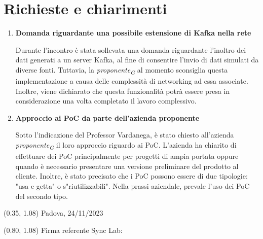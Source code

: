 \documentclass{article}
\begin{document}
\section{Richieste e chiarimenti}
\begin{enumerate}
    \item \textbf{Domanda riguardante una possibile estensione di Kafka nella rete}
    
    Durante l'incontro è stata sollevata una domanda riguardante l'inoltro dei dati generati a un server Kafka, al fine di consentire l'invio di dati simulati da diverse fonti. Tuttavia, la \textit{proponente}\textsubscript{\textit{G}} al momento sconsiglia questa implementazione a causa delle complessità di networking ad essa associate.  
    Inoltre, viene dichiarato che questa funzionalità potrà essere presa in considerazione una volta completato il lavoro complessivo. 

    \item \textbf{Approccio ai PoC da parte dell'azienda proponente}
    
    Sotto l'indicazione del Professor Vardanega, è stato chiesto all’azienda \textit{proponente}\textsubscript{\textit{G}} il loro approccio riguardo ai PoC. L'azienda ha chiarito di effettuare dei PoC principalmente per progetti di ampia portata oppure quando è necessario presentare una versione preliminare del prodotto al cliente. Inoltre, è stato precisato che i PoC possono essere di due tipologie: "usa e getta" o s"riutilizzabili". Nella prassi aziendale, prevale l'uso dei PoC del secondo tipo.  

\end{enumerate}
    
    
    
\begin{textblock*}{\textwidth}(0.35\textwidth, 1.08\textheight)
    Padova, 24/11/2023
\end{textblock*}

\begin{textblock*}{\textwidth}(0.80\textwidth, 1.08\textheight)
        Firma referente Sync Lab:
\end{textblock*}
\end{document}

